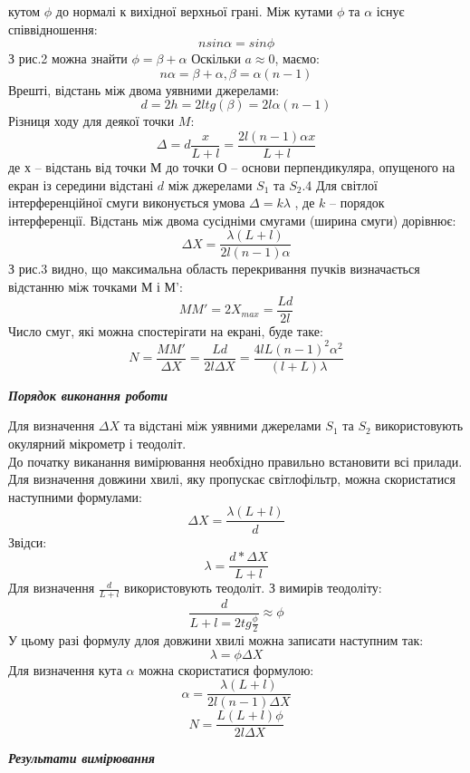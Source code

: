 кутом $\phi$ до нормалі к вихідної верхньої грані. Між кутами $\phi$ та $\alpha$ існує співвідношення:
$$nsin\alpha = sin\phi$$
З рис.2 можна знайти $\phi = \beta + \alpha$
Оскільки $a \approx 0$, маємо:
$$n\alpha = \beta + \alpha, \beta = \alpha(n-1)$$
Врешті, відстань між двома уявними джерелами:
$$d = 2h = 2l tg(\beta) = 2l \alpha(n-1)$$
Різниця ходу для деякої точки $M$:
$$\Delta = d\frac{x}{L+l} = \frac{2l(n-1)\alpha x}{L+l}$$
де $х$ – відстань від точки $М$ до точки $О$ – основи перпендикуляра, опущеного на екран із середини
відстані $d$ між джерелами $S_1$ та $S_2$.4 Для світлої інтерференційної смуги виконується умова $\Delta = k\lambda$ ,
де $k$ – порядок інтерференції. Відстань між двома сусідніми смугами (ширина смуги) дорівнює:
$$\Delta X = \frac{\lambda(L+l)}{2l(n-1)\alpha}$$
З рис.3 видно, що максимальна область перекривання пучків визначається відстанню між
точками М і М’:
$$MM' = 2X_{max} = \frac{Ld}{2l}$$
Число смуг, які можна спостерігати на екрані, буде таке:
$$N = \frac{MM'}{\Delta X} = \frac{Ld}{2l\Delta X} = \frac{4lL(n-1)^2 {\alpha}^2}{(l+L)\lambda}$$
\begin{center}
  {\textbf{\emph{Порядок виконання роботи}}}
\end{center}
\indent Для визначення $\Delta X$ та відстані між уявними джерелами $S_1$ та $S_2$ використовують окулярний мікрометр і теодоліт.\\
До початку виканання вимірювання необхідно правильно встановити всі прилади.\\
Для визначення довжини хвилі, яку пропускає світлофільтр, можна скористатися наступними формулами:
$$\Delta X = \frac{\lambda (L+l)}{d}$$
Звідси:
$$\lambda = \frac{d*\Delta X}{L+l}$$
Для визначення $\frac{d}{L+l}$ використовують теодоліт. З вимирів теодоліту:
$$\frac{d}{L+l = 2tg\frac{\phi}{2}} \approx \phi$$
У цьому разі формулу длоя довжини хвилі можна записати наступним так:
$$\lambda = \phi \Delta X$$
Для визначення кута $\alpha$ можна скористатися формулою:
$$\alpha = \frac{\lambda(L+l)}{2l(n-1)\Delta X}$$
$$N = \frac{L(L+l)\phi}{2l\Delta X}$$
\begin{center}
  {\textbf{\emph{Результати вимірювання}}}
\end{center}
